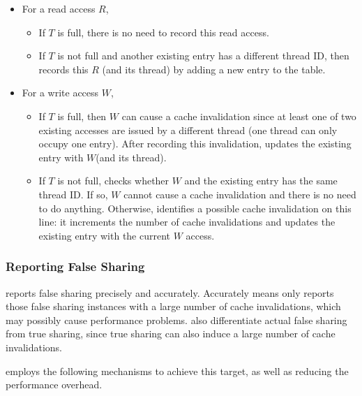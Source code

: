 \begin{itemize}
\item
  For a read access $R$, 
  \begin{itemize}
    \item
      If $T$ is full, there is no need to record this read access.
    \item
      If $T$ is not full and another existing entry has a different thread
      ID, then \Predator{} records this $R$ (and its thread) by adding a new entry to the table. 
  \end{itemize}
\item
  For a write access $W$, 
  \begin{itemize}
    \item
      If $T$ is full, then $W$ can cause a cache invalidation since at least one of two existing accesses are issued by a different thread (one thread can only occupy one entry).
      After recording this invalidation, \Predator{} updates the existing entry with $W$(and its thread).
    \item
      If $T$ is not full,
      \Predator{} checks whether $W$ and the existing entry has the same thread ID. If so, $W$ cannot cause a cache invalidation and there is no need to do anything. Otherwise, \Predator{} identifies a possible cache invalidation on this line: it increments the number of cache invalidations and updates the existing entry with the current $W$ access.
  \end{itemize}
\end{itemize}

\subsubsection{Reporting False Sharing}
\label{sec:predatorcallsite}

\Predator{} reports false sharing precisely and accurately. Accurately means \Predator{} only reports those false sharing instances with a large number of cache invalidations, which may possibly cause performance problems. \Predator{} also differentiate actual false sharing from true sharing, since true sharing can also induce a large number of cache invalidations.

\Predator{} employs the following mechanisms to achieve this target, as well as reducing the performance overhead.  

